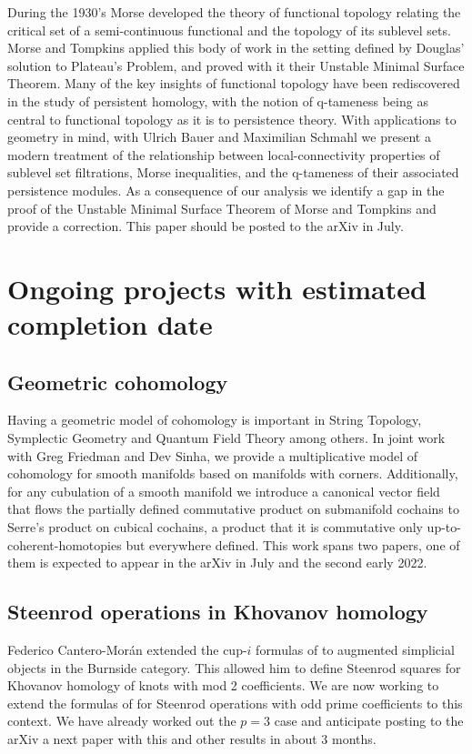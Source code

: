 \documentclass{amsart}
\theoremstyle{definition}
\begin{document}
	During the 1930's Morse developed the theory of functional topology relating the critical set of a semi-continuous functional and the topology of its sublevel sets.
	Morse and Tompkins applied this body of work in the setting defined by Douglas' solution to Plateau's Problem, and proved with it their Unstable Minimal Surface Theorem.
	Many of the key insights of functional topology have been rediscovered in the study of persistent homology, with the notion of q-tameness being as central to functional topology as it is to persistence theory.
	With applications to geometry in mind, with Ulrich Bauer and Maximilian Schmahl we present a modern treatment of the relationship between local-connectivity properties of sublevel set filtrations, Morse inequalities, and the q-tameness of their associated persistence modules.
	As a consequence of our analysis we identify a gap in the proof of the Unstable Minimal Surface Theorem of Morse and Tompkins and provide a correction.
	This paper should be posted to the arXiv in July.


	\section{Ongoing projects with estimated completion date}

	\subsection{Geometric cohomology}

	Having a geometric model of cohomology is important in String Topology, Symplectic Geometry and Quantum Field Theory among others.
	In joint work with Greg Friedman and Dev Sinha, we provide a multiplicative model of cohomology for smooth manifolds based on manifolds with corners.
	Additionally, for any cubulation of a smooth manifold we introduce a canonical vector field that flows the partially defined commutative product on submanifold cochains to Serre's product on cubical cochains, a product that it is commutative only up-to-coherent-homotopies but everywhere defined.
	This work spans two papers, one of them is expected to appear in the arXiv in July and the second early 2022.

	\subsection{Steenrod operations in Khovanov homology}

	Federico Cantero-Mor\'an extended the cup-$i$ formulas of \cite{medina2021newformulas} to augmented simplicial objects in the Burnside category.
	This allowed him to define Steenrod squares for Khovanov homology of knots with mod 2 coefficients.
	We are now working to extend the formulas of \cite{medina2020odd} for Steenrod operations with odd prime coefficients to this context.
	We have already worked out the $p=3$ case and anticipate posting to the arXiv a next paper with this and other results in about 3 months.
\end{document}
